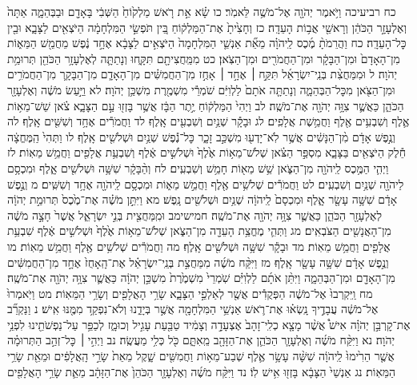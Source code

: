 \documentclass[twoside, openany, parskip=half, 11pt]{book}
\begin{document}
כח רביעיכה וַיֹּ֥אמֶר יְהֹוָ֖ה אֶל־מֹשֶׁ֥ה לֵּאמֹֽר׃ כו שָׂ֗א אֵ֣ת רֹ֤אשׁ מַלְק֙וֹחַ֙ הַשְּׁבִ֔י בָּאָדָ֖ם וּבַבְּהֵמָ֑ה אַתָּה֙ וְאֶלְעָזָ֣ר הַכֹּהֵ֔ן וְרָאשֵׁ֖י אֲב֥וֹת הָעֵדָֽה׃ כז וְחָצִ֙יתָ֙ אֶת־הַמַּלְק֔וֹחַ בֵּ֚ין תֹּפְשֵׂ֣י הַמִּלְחָמָ֔ה הַיֹּצְאִ֖ים לַצָּבָ֑א וּבֵ֖ין כׇּל־הָעֵדָֽה׃ כח וַהֲרֵמֹתָ֨ מֶ֜כֶס לַֽיהֹוָ֗ה מֵאֵ֞ת אַנְשֵׁ֤י הַמִּלְחָמָה֙ הַיֹּצְאִ֣ים לַצָּבָ֔א אֶחָ֣ד נֶ֔פֶשׁ מֵחֲמֵ֖שׁ הַמֵּא֑וֹת מִן־הָאָדָם֙ וּמִן־הַבָּקָ֔ר וּמִן־הַחֲמֹרִ֖ים וּמִן־הַצֹּֽאן׃ כט מִמַּֽחֲצִיתָ֖ם תִּקָּ֑חוּ וְנָתַתָּ֛ה לְאֶלְעָזָ֥ר הַכֹּהֵ֖ן תְּרוּמַ֥ת יְהֹוָה׃ ל וּמִמַּחֲצִ֨ת בְּנֵֽי־יִשְׂרָאֵ֜ל תִּקַּ֣ח ׀ אֶחָ֣ד ׀ אָחֻ֣ז מִן־הַחֲמִשִּׁ֗ים מִן־הָאָדָ֧ם מִן־הַבָּקָ֛ר מִן־הַחֲמֹרִ֥ים וּמִן־הַצֹּ֖אן מִכׇּל־הַבְּהֵמָ֑ה וְנָתַתָּ֤ה אֹתָם֙ לַלְוִיִּ֔ם שֹׁמְרֵ֕י מִשְׁמֶ֖רֶת מִשְׁכַּ֥ן יְהֹוָה׃ לא וַיַּ֣עַשׂ מֹשֶׁ֔ה וְאֶלְעָזָ֖ר הַכֹּהֵ֑ן כַּאֲשֶׁ֛ר צִוָּ֥ה יְהֹוָ֖ה אֶת־מֹשֶֽׁה׃ לב וַיְהִי֙ הַמַּלְק֔וֹחַ יֶ֣תֶר הַבָּ֔ז אֲשֶׁ֥ר בָּזְז֖וּ עַ֣ם הַצָּבָ֑א צֹ֗אן שֵׁשׁ־מֵא֥וֹת אֶ֛לֶף וְשִׁבְעִ֥ים אֶ֖לֶף וַחֲמֵ֥שֶׁת אֲלָפִֽים׃ לג וּבָקָ֕ר שְׁנַ֥יִם וְשִׁבְעִ֖ים אָֽלֶף׃ לד וַחֲמֹרִ֕ים אֶחָ֥ד וְשִׁשִּׁ֖ים אָֽלֶף׃ לה וְנֶ֣פֶשׁ אָדָ֔ם מִ֨ן־הַנָּשִׁ֔ים אֲשֶׁ֥ר לֹֽא־יָדְע֖וּ מִשְׁכַּ֣ב זָכָ֑ר כׇּל־נֶ֕פֶשׁ שְׁנַ֥יִם וּשְׁלֹשִׁ֖ים אָֽלֶף׃ לו וַתְּהִי֙ הַֽמֶּחֱצָ֔ה חֵ֕לֶק הַיֹּצְאִ֖ים בַּצָּבָ֑א מִסְפַּ֣ר הַצֹּ֗אן שְׁלֹשׁ־מֵא֥וֹת אֶ֙לֶף֙ וּשְׁלֹשִׁ֣ים אֶ֔לֶף וְשִׁבְעַ֥ת אֲלָפִ֖ים וַחֲמֵ֥שׁ מֵאֽוֹת׃ לז וַיְהִ֛י הַמֶּ֥כֶס לַֽיהֹוָ֖ה מִן־הַצֹּ֑אן שֵׁ֥שׁ מֵא֖וֹת חָמֵ֥שׁ וְשִׁבְעִֽים׃ לח וְהַ֨בָּקָ֔ר שִׁשָּׁ֥ה וּשְׁלֹשִׁ֖ים אָ֑לֶף וּמִכְסָ֥ם לַיהֹוָ֖ה שְׁנַ֥יִם וְשִׁבְעִֽים׃ לט וַחֲמֹרִ֕ים שְׁלֹשִׁ֥ים אֶ֖לֶף וַחֲמֵ֣שׁ מֵא֑וֹת וּמִכְסָ֥ם לַֽיהֹוָ֖ה אֶחָ֥ד וְשִׁשִּֽׁים׃ מ וְנֶ֣פֶשׁ אָדָ֔ם שִׁשָּׁ֥ה עָשָׂ֖ר אָ֑לֶף וּמִכְסָם֙ לַֽיהֹוָ֔ה שְׁנַ֥יִם וּשְׁלֹשִׁ֖ים נָֽפֶשׁ׃ מא וַיִּתֵּ֣ן מֹשֶׁ֗ה אֶת־מֶ֙כֶס֙ תְּרוּמַ֣ת יְהֹוָ֔ה לְאֶלְעָזָ֖ר הַכֹּהֵ֑ן כַּאֲשֶׁ֛ר צִוָּ֥ה יְהֹוָ֖ה אֶת־מֹשֶֽׁה׃ חמישימב וּמִֽמַּחֲצִ֖ית בְּנֵ֣י יִשְׂרָאֵ֑ל אֲשֶׁר֙ חָצָ֣ה מֹשֶׁ֔ה מִן־הָאֲנָשִׁ֖ים הַצֹּבְאִֽים׃ מג וַתְּהִ֛י מֶחֱצַ֥ת הָעֵדָ֖ה מִן־הַצֹּ֑אן שְׁלֹשׁ־מֵא֥וֹת אֶ֙לֶף֙ וּשְׁלֹשִׁ֣ים אֶ֔לֶף שִׁבְעַ֥ת אֲלָפִ֖ים וַחֲמֵ֥שׁ מֵאֽוֹת׃ מד וּבָקָ֕ר שִׁשָּׁ֥ה וּשְׁלֹשִׁ֖ים אָֽלֶף׃ מה וַחֲמֹרִ֕ים שְׁלֹשִׁ֥ים אֶ֖לֶף וַחֲמֵ֥שׁ מֵאֽוֹת׃ מו וְנֶ֣פֶשׁ אָדָ֔ם שִׁשָּׁ֥ה עָשָׂ֖ר אָֽלֶף׃ מז וַיִּקַּ֨ח מֹשֶׁ֜ה מִמַּחֲצִ֣ת בְּנֵֽי־יִשְׂרָאֵ֗ל אֶת־הָֽאָחֻז֙ אֶחָ֣ד מִן־הַחֲמִשִּׁ֔ים מִן־הָאָדָ֖ם וּמִן־הַבְּהֵמָ֑ה וַיִּתֵּ֨ן אֹתָ֜ם לַלְוִיִּ֗ם שֹֽׁמְרֵי֙ מִשְׁמֶ֙רֶת֙ מִשְׁכַּ֣ן יְהֹוָ֔ה כַּאֲשֶׁ֛ר צִוָּ֥ה יְהֹוָ֖ה אֶת־מֹשֶֽׁה׃ מח וַֽיִּקְרְבוּ֙ אֶל־מֹשֶׁ֔ה הַפְּקֻדִ֕ים אֲשֶׁ֖ר לְאַלְפֵ֣י הַצָּבָ֑א שָׂרֵ֥י הָאֲלָפִ֖ים וְשָׂרֵ֥י הַמֵּאֽוֹת׃ מט וַיֹּֽאמְרוּ֙ אֶל־מֹשֶׁ֔ה עֲבָדֶ֣יךָ נָֽשְׂא֗וּ אֶת־רֹ֛אשׁ אַנְשֵׁ֥י הַמִּלְחָמָ֖ה אֲשֶׁ֣ר בְּיָדֵ֑נוּ וְלֹא־נִפְקַ֥ד מִמֶּ֖נּוּ אִֽישׁ׃ נ וַנַּקְרֵ֞ב אֶת־קׇרְבַּ֣ן יְהֹוָ֗ה אִישׁ֩ אֲשֶׁ֨ר מָצָ֤א כְלִֽי־זָהָב֙ אֶצְעָדָ֣ה וְצָמִ֔יד טַבַּ֖עַת עָגִ֣יל וְכוּמָ֑ז לְכַפֵּ֥ר עַל־נַפְשֹׁתֵ֖ינוּ לִפְנֵ֥י יְהֹוָה׃ נא וַיִּקַּ֨ח מֹשֶׁ֜ה וְאֶלְעָזָ֧ר הַכֹּהֵ֛ן אֶת־הַזָּהָ֖ב מֵֽאִתָּ֑ם כֹּ֖ל כְּלִ֥י מַעֲשֶֽׂה׃ נב וַיְהִ֣י ׀ כׇּל־זְהַ֣ב הַתְּרוּמָ֗ה אֲשֶׁ֤ר הֵרִ֙ימוּ֙ לַֽיהֹוָ֔ה שִׁשָּׁ֨ה עָשָׂ֥ר אֶ֛לֶף שְׁבַע־מֵא֥וֹת וַחֲמִשִּׁ֖ים שָׁ֑קֶל מֵאֵת֙ שָׂרֵ֣י הָֽאֲלָפִ֔ים וּמֵאֵ֖ת שָׂרֵ֥י הַמֵּאֽוֹת׃ נג אַנְשֵׁי֙ הַצָּבָ֔א בָּזְז֖וּ אִ֥ישׁ לֽוֹ׃ נד וַיִּקַּ֨ח מֹשֶׁ֜ה וְאֶלְעָזָ֤ר הַכֹּהֵן֙ אֶת־הַזָּהָ֔ב מֵאֵ֛ת שָׂרֵ֥י הָאֲלָפִ֖ים 
\end{document}
